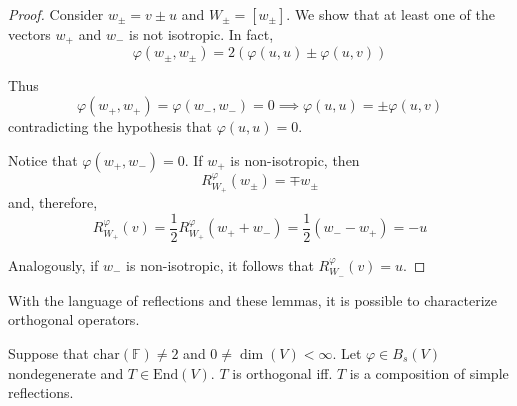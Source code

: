 \begin{proof}
  Consider $w_\pm = v \pm u$ and $W_\pm = [w_\pm]$. We show that at least one of the vectors $w_+$ and $w_-$ is not isotropic. In fact,
  \[
    \varphi(w_\pm, w_\pm) = 2(\varphi(u,u) \pm \varphi(u,v))
  \]

  Thus
  \[
    \varphi(w_+, w_+) = \varphi(w_-, w_-) = 0 \implies \varphi(u,u) = \pm \varphi(u,v)
  \]
  contradicting the hypothesis that $\varphi(u,u) = 0$. 

  Notice that $\varphi(w_+, w_-) = 0$. If $w_+$ is non-isotropic, then
  \[
    R_{W_+}^\varphi(w_\pm) = \mp w_\pm
  \]
  and, therefore, 
  \[
    R_{W_+}^\varphi(v) = \frac{1}{2} R_{W_+}^\varphi(w_+ + w_-) = \frac{1}{2} (w_- - w_+) = - u
  \]

  Analogously, if $w_-$ is non-isotropic, it follows that $R_{W_-}^\varphi(v) = u$.
\end{proof}

With the language of reflections and these lemmas, it is possible to characterize orthogonal operators.

\begin{theorem}\label{thm:202301041019}
  Suppose that $\text{char}(\mathbb{F}) \neq 2$ and $0 \neq \dim(V) < \infty$. Let $\varphi \in B_s(V)$ nondegenerate and $T \in \text{End}(V)$. $T$ is orthogonal iff. $T$ is a composition of simple reflections.
\end{theorem}

